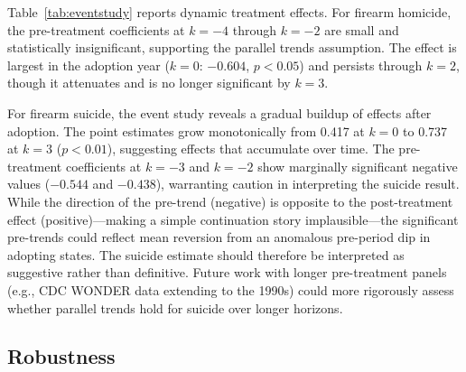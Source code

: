 \documentclass[12pt]{article}
\begin{document}
Table~\ref{tab:eventstudy} reports dynamic treatment effects. For firearm homicide, the pre-treatment coefficients at $k = -4$ through $k = -2$ are small and statistically insignificant, supporting the parallel trends assumption. The effect is largest in the adoption year ($k = 0$: $-0.604$, $p < 0.05$) and persists through $k = 2$, though it attenuates and is no longer significant by $k = 3$.

For firearm suicide, the event study reveals a gradual buildup of effects after adoption. The point estimates grow monotonically from 0.417 at $k = 0$ to 0.737 at $k = 3$ ($p < 0.01$), suggesting effects that accumulate over time. The pre-treatment coefficients at $k = -3$ and $k = -2$ show marginally significant negative values ($-0.544$ and $-0.438$), warranting caution in interpreting the suicide result. While the direction of the pre-trend (negative) is opposite to the post-treatment effect (positive)---making a simple continuation story implausible---the significant pre-trends could reflect mean reversion from an anomalous pre-period dip in adopting states. The suicide estimate should therefore be interpreted as suggestive rather than definitive. Future work with longer pre-treatment panels (e.g., CDC WONDER data extending to the 1990s) could more rigorously assess whether parallel trends hold for suicide over longer horizons.

\subsection{Robustness}
\end{document}
